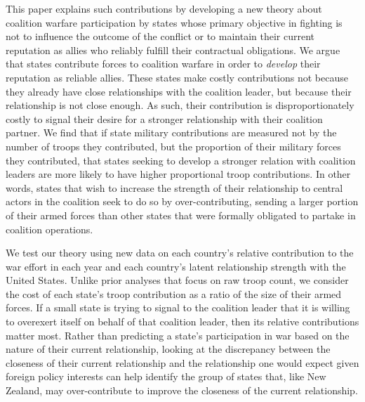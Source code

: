 \documentclass[12pt,letterpaper]{article}
\begin{document}
	This paper explains such contributions by developing a new theory about coalition warfare participation by states whose primary objective in fighting is not to influence the outcome of the conflict or to maintain their current reputation as allies who reliably fulfill their contractual obligations. We argue that states contribute forces to coalition warfare in order to \textit{develop} their reputation as reliable allies. These states make costly contributions not because they already have close relationships with the coalition leader, but because their relationship is not close enough. As such, their contribution is disproportionately costly to signal their desire for a stronger relationship with their coalition partner. We find that if state military contributions are measured not by the number of troops they contributed, but the proportion of their military forces they contributed, that states seeking to develop a stronger relation with coalition leaders are more likely to have higher proportional troop contributions. In other words, states that wish to increase the strength of their relationship to central actors in the coalition seek to do so by over-contributing, sending a larger portion of their armed forces than other states that were formally obligated to partake in coalition operations.
	
	We test our theory using new data on each country's relative contribution to the war effort in each year and each country's latent relationship strength with the United States. Unlike prior analyses that focus on raw troop count, we consider the cost of each state's troop contribution as a ratio of the size of their armed forces. If a small state is trying to signal to the coalition leader that it is willing to overexert itself on behalf of that coalition leader, then its relative contributions matter most. Rather than predicting a state's participation in war based on the nature of their current relationship, looking at the discrepancy between the closeness of their current relationship and the relationship one would expect given foreign policy interests can help identify the group of states that, like New Zealand, may over-contribute to improve the closeness of the current relationship.
	
\end{document}
